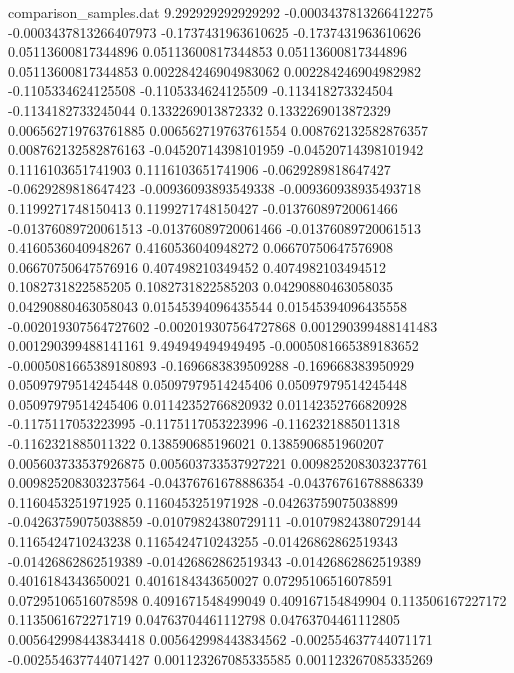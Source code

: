 \begin{filecontents}{comparison_samples.dat}
9.292929292929292   -0.0003437813266412275  -0.0003437813266407973  -0.1737431963610625    -0.1737431963610626    0.05113600817344896    0.05113600817344853    0.05113600817344896    0.05113600817344853    0.002284246904983062   0.002284246904982982   -0.1105334624125508     -0.1105334624125509     -0.113418273324504     -0.1134182733245044    0.1332269013872332      0.1332269013872329      0.006562719763761885    0.006562719763761554    0.008762132582876357    0.008762132582876163    -0.04520714398101959    -0.04520714398101942    0.1116103651741903      0.1116103651741906      -0.0629289818647427     -0.0629289818647423     -0.00936093893549338   -0.009360938935493718  0.1199271748150413     0.1199271748150427     -0.01376089720061466    -0.01376089720061513    -0.01376089720061466    -0.01376089720061513    0.4160536040948267     0.4160536040948272     0.06670750647576908     0.06670750647576916     0.407498210349452      0.4074982103494512     0.1082731822585205      0.1082731822585203      0.04290880463058035     0.04290880463058043     0.01545394096435544    0.01545394096435558    -0.002019307564727602  -0.002019307564727868  0.001290399488141483    0.001290399488141161  
9.494949494949495   -0.0005081665389183652  -0.0005081665389180893  -0.1696683839509288    -0.169668383950929     0.05097979514245448    0.05097979514245406    0.05097979514245448    0.05097979514245406    0.01142352766820932    0.01142352766820928    -0.1175117053223995     -0.1175117053223996     -0.1162321885011318    -0.1162321885011322    0.138590685196021       0.1385906851960207      0.005603733537926875    0.005603733537927221    0.009825208303237761    0.009825208303237564    -0.04376761678886354    -0.04376761678886339    0.1160453251971925      0.1160453251971928      -0.04263759075038899    -0.04263759075038859    -0.01079824380729111   -0.01079824380729144   0.1165424710243238     0.1165424710243255     -0.01426862862519343    -0.01426862862519389    -0.01426862862519343    -0.01426862862519389    0.4016184343650021     0.4016184343650027     0.07295106516078591     0.07295106516078598     0.4091671548499049     0.409167154849904      0.113506167227172       0.1135061672271719      0.04763704461112798     0.04763704461112805     0.005642998443834418   0.005642998443834562   -0.002554637744071171  -0.002554637744071427  0.001123267085335585    0.001123267085335269  

\end{filecontents}
